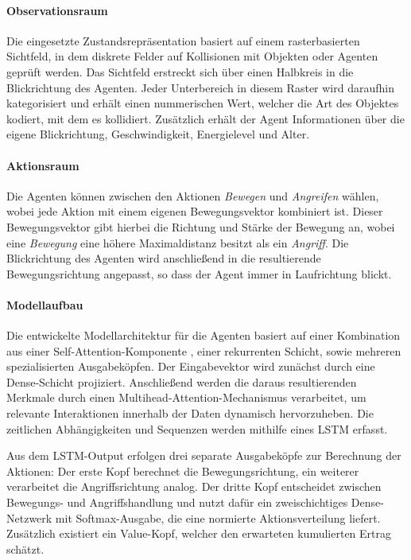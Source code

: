 \paragraph{Observationsraum}
Die eingesetzte Zustandsrepräsentation basiert auf einem rasterbasierten Sichtfeld, in dem diskrete Felder auf Kollisionen mit Objekten oder Agenten geprüft werden. Das Sichtfeld erstreckt sich über einen Halbkreis in die Blickrichtung des Agenten. Jeder Unterbereich in diesem Raster wird daraufhin kategorisiert und erhält einen nummerischen Wert, welcher die Art des Objektes kodiert, mit dem es kollidiert. Zusätzlich erhält der Agent Informationen über die eigene Blickrichtung, Geschwindigkeit, Energielevel und Alter.

\paragraph{Aktionsraum}
Die Agenten können zwischen den Aktionen \textit{Bewegen} und \textit{Angreifen} wählen, wobei jede Aktion mit einem eigenen Bewegungsvektor kombiniert ist. Dieser Bewegungsvektor gibt hierbei die Richtung und Stärke der Bewegung an, wobei eine \textit{Bewegung} eine höhere Maximaldistanz besitzt als ein \textit{Angriff}. Die Blickrichtung des Agenten wird anschließend in die resultierende Bewegungsrichtung angepasst, so dass der Agent immer in Laufrichtung blickt.

\paragraph{Modellaufbau}

Die entwickelte Modellarchitektur für die Agenten basiert auf einer Kombination aus einer Self-Attention-Komponente \cite{vaswani2023attentionneed}, einer rekurrenten Schicht, sowie mehreren spezialisierten Ausgabeköpfen. Der Eingabevektor wird zunächst durch eine Dense-Schicht projiziert. Anschließend werden die daraus resultierenden Merkmale durch einen Multihead-Attention-Mechanismus verarbeitet, um relevante Interaktionen innerhalb der Daten dynamisch hervorzuheben. Die zeitlichen Abhängigkeiten und Sequenzen werden mithilfe eines LSTM erfasst.

Aus dem LSTM-Output erfolgen drei separate Ausgabeköpfe zur Berechnung der Aktionen: Der erste Kopf berechnet die Bewegungsrichtung, ein weiterer verarbeitet die Angriffsrichtung analog. Der dritte Kopf entscheidet zwischen Bewegungs- und Angriffshandlung und nutzt dafür ein zweischichtiges Dense-Netzwerk mit Softmax-Ausgabe, die eine normierte Aktionsverteilung liefert. Zusätzlich existiert ein Value-Kopf, welcher den erwarteten kumulierten Ertrag schätzt.

